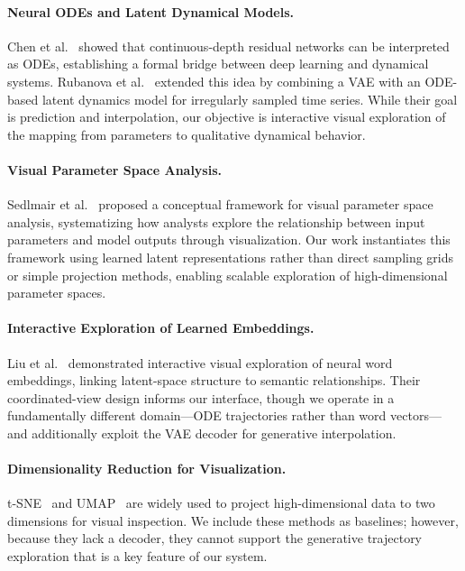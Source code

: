 \documentclass{article}
\begin{document}
\paragraph{Neural ODEs and Latent Dynamical Models.}
Chen et al.~\cite{chen2018neural} showed that continuous-depth residual
networks can be interpreted as ODEs, establishing a formal bridge between deep
learning and dynamical systems. Rubanova et
al.~\cite{rubanova2019latent} extended this idea by combining a VAE with an
ODE-based latent dynamics model for irregularly sampled time series. While
their goal is prediction and interpolation, our objective is interactive visual
exploration of the mapping from parameters to qualitative dynamical behavior.

\paragraph{Visual Parameter Space Analysis.}
Sedlmair et al.~\cite{sedlmair2014visual} proposed a conceptual framework for
visual parameter space analysis, systematizing how analysts explore the
relationship between input parameters and model outputs through visualization.
Our work instantiates this framework using learned latent representations
rather than direct sampling grids or simple projection methods, enabling
scalable exploration of high-dimensional parameter spaces.

\paragraph{Interactive Exploration of Learned Embeddings.}
Liu et al.~\cite{liu2018visual} demonstrated interactive visual exploration of
neural word embeddings, linking latent-space structure to semantic
relationships. Their coordinated-view design informs our interface, though we
operate in a fundamentally different domain---ODE trajectories rather than word
vectors---and additionally exploit the VAE decoder for generative
interpolation.

\paragraph{Dimensionality Reduction for Visualization.}
t-SNE~\cite{vandermaaten2008visualizing} and UMAP~\cite{mcinnes2018umap} are
widely used to project high-dimensional data to two dimensions for visual
inspection. We include these methods as baselines; however, because they lack a
decoder, they cannot support the generative trajectory exploration that is a
key feature of our system.
\end{document}

